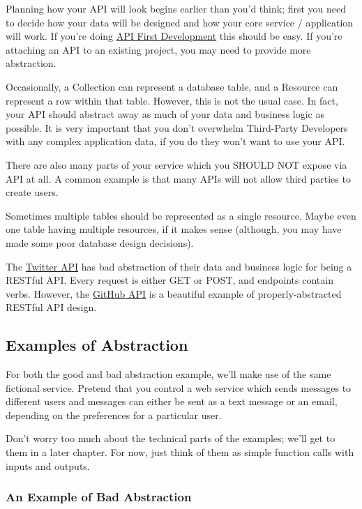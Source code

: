 \documentclass{book}
\begin{document}
Planning how your API will look begins earlier than you'd think; first you need to decide how your data will be designed and how your core service / application will work. If you're doing \href{http://blog.pop.co/post/67465239611/why-we-chose-api-first-development}{API First Development} this should be easy. If you're attaching an API to an existing project, you may need to provide more abstraction.

Occasionally, a Collection can represent a database table, and a Resource can represent a row within that table. However, this is not the usual case. In fact, your API should abstract away as much of your data and business logic as possible. It is very important that you don't overwhelm Third-Party Developers with any complex application data, if you do they won't want to use your API.

There are also many parts of your service which you SHOULD NOT expose via API at all. A common example is that many APIs will not allow third parties to create users.

Sometimes multiple tables should be represented as a single resource. Maybe even one table having multiple resources, if it makes sense (although, you may have made some poor database design decisions).

The \href{https://dev.twitter.com/docs/api/1.1}{Twitter API} has bad abstraction of their data and business logic for being a RESTful API. Every request is either GET or POST, and endpoints contain verbs. However, the \href{http://developer.github.com/v3/}{GitHub API} is a beautiful example of properly-abstracted RESTful API design.

\subsection{Examples of Abstraction}

For both the good and bad abstraction example, we'll make use of the same fictional service. Pretend that you control a web service which sends messages to different users and messages can either be sent as a text message or an email, depending on the preferences for a particular user.

Don't worry too much about the technical parts of the examples; we'll get to them in a later chapter. For now, just think of them as simple function calls with inputs and outputs.

\subsubsection{An Example of Bad Abstraction}
\end{document}
